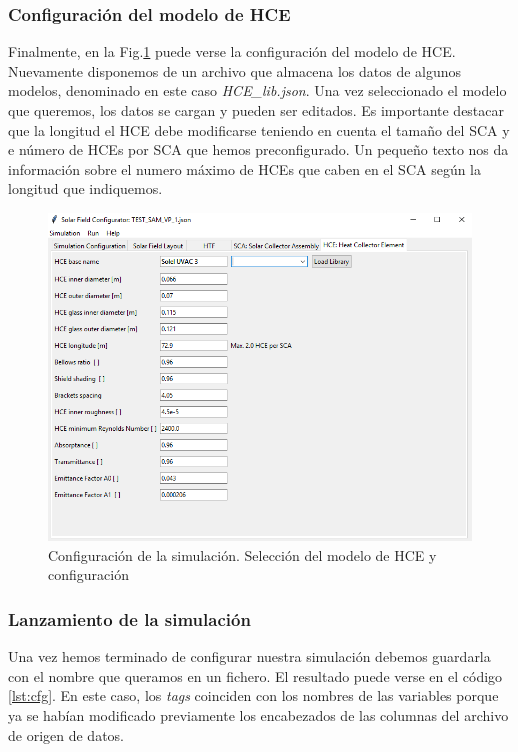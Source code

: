 \subsubsection{Configuración del modelo de HCE} 
 
 Finalmente, en la Fig.\ref{fig:interface05} puede verse la configuración del modelo de HCE. Nuevamente disponemos de un archivo que almacena los datos de algunos modelos, denominado en este caso \emph{HCE\_lib.json}. Una vez seleccionado el  modelo que queremos, los datos se cargan y pueden ser editados. Es importante destacar que la longitud el HCE debe modificarse teniendo en cuenta el tamaño del SCA y e número de HCEs por SCA que hemos preconfigurado. Un pequeño texto nos da información sobre el numero máximo de HCEs que caben en el SCA según la longitud que indiquemos.

\begin{figure}[H]
\includegraphics[width=0.9\linewidth]{images/interface05.png}
\caption{Configuración de la simulación. Selección del modelo de HCE y configuración} 
\label{fig:interface05}
\end{figure}


\subsubsection{Lanzamiento de la simulación}

Una vez hemos terminado de configurar nuestra simulación debemos guardarla con el nombre que queramos en un fichero. El resultado puede verse en el código \ref{lst:cfg}.  En este caso, los \emph{tags} coinciden con los nombres de las variables porque ya se habían modificado previamente   los encabezados de las columnas del archivo de origen de datos.

